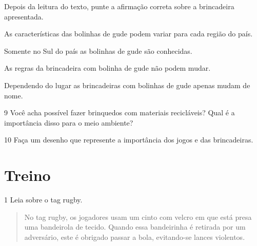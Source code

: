 \noindent{}Depois da leitura do texto, punte a afirmação correta sobre a
brincadeira apresentada.

\begin{escolha}
\item
  As características das bolinhas de gude podem variar para cada região
  do país.
\item
  Somente no Sul do país as bolinhas de gude são conhecidas.
\item
  As regras da brincadeira com bolinha de gude não podem mudar.
\item
  Dependendo do lugar as brincadeiras com bolinhas de gude apenas mudam
  de nome.
\end{escolha}



\num{9} Você acha possível fazer brinquedos com materiais recicláveis? Qual é a importância disso para o meio ambiente?


\num{10} Faça um desenho que represente a importância dos jogos e das brincadeiras.

\begin{mdframed}[linewidth=2pt,linecolor=salmao]
\vspace{4cm}
\end{mdframed}

\section*{Treino}

\num{1} Leia sobre o tag rugby.
\begin{quote}
  No tag rugby, os jogadores usam um cinto com
  velcro em que está presa uma bandeirola de tecido. Quando essa bandeirinha é retirada
  por um adversário, este é obrigado passar a bola, evitando-se lances violentos.

\end{quote}

